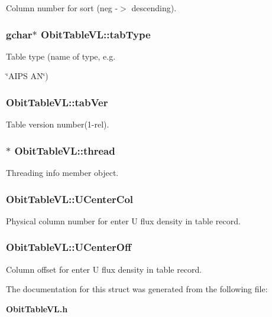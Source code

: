 Column number for sort (neg -$>$ descending). 

\subsubsection{\setlength{\rightskip}{0pt plus 5cm}gchar$\ast$ {\bf Obit\-Table\-VL::tab\-Type}}\label{structObitTableVL_o12}


Table type (name of type, e.g. 

\char`\"{}AIPS AN\char`\"{}) 
\subsubsection{ {\bf Obit\-Table\-VL::tab\-Ver}}\label{structObitTableVL_o13}


Table version number(1-rel). 

\subsubsection{$\ast$ {\bf Obit\-Table\-VL::thread}}\label{structObitTableVL_o4}


Threading info member object. 

\subsubsection{ {\bf Obit\-Table\-VL::UCenter\-Col}}\label{structObitTableVL_o60}


Physical column number for enter U flux density in table record. 

\subsubsection{ {\bf Obit\-Table\-VL::UCenter\-Off}}\label{structObitTableVL_o59}


Column offset for enter U flux density in table record. 



The documentation for this struct was generated from the following file:\begin{CompactItemize}
\item 
{\bf Obit\-Table\-VL.h}\end{CompactItemize}
